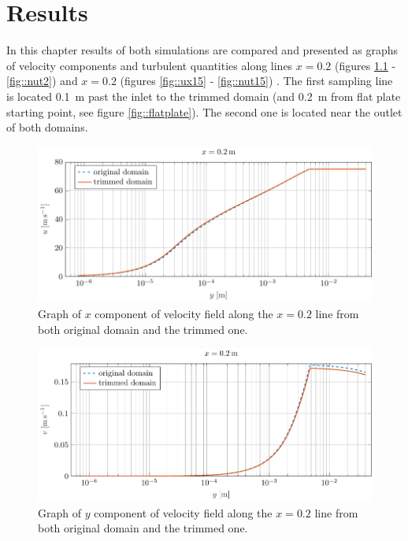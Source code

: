 \chapter{Results}
In this chapter results of both simulations are compared and presented as graphs of velocity components and turbulent quantities along lines $x=0.2$ (figures \ref{fig::ux2} - \ref{fig::nut2}) and $x=0.2$ (figures \ref{fig::ux15} - \ref{fig::nut15}) .
The first sampling line is located \SI{0,1}{\meter} past the inlet to the trimmed domain (and \SI{0,2}{\meter} from flat plate starting point, see figure \ref{fig::flatplate}). The second one is located near the outlet of both domains.

\begin{figure}[h]
\centering
\includegraphics[width=13.5cm]{Results/ux2.pdf}
\caption{Graph of $x$ component of velocity field along the $x=0.2$ line from both original domain and the trimmed one.}
\label{fig::ux2}
\end{figure}

\begin{figure}[h]
\centering
\includegraphics[width=13.5cm]{Results/uy2.pdf}
\caption{Graph of $y$ component of velocity field along the $x=0.2$ line from both original domain and the trimmed one.}
\label{fig::uy2}
\end{figure}


